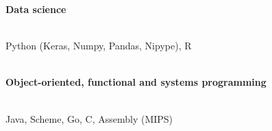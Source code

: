 \documentclass[margin]{res}
\begin{document}
\begin{resume}
\textbf{Data science}\\
\vspace{-2.5em}\\
\begin{adjustwidth}{5mm}{}
Python (Keras, Numpy, Pandas, Nipype), R\\%
\end{adjustwidth}
\vspace{-2em}\\

\textbf{Object-oriented, functional and systems programming}\\
\vspace{-2.5em}\\
\begin{adjustwidth}{5mm}{}
Java, Scheme, Go, C, Assembly (MIPS)\\
\end{adjustwidth}
\vspace{-2em}\\


\end{resume}
\end{document}
